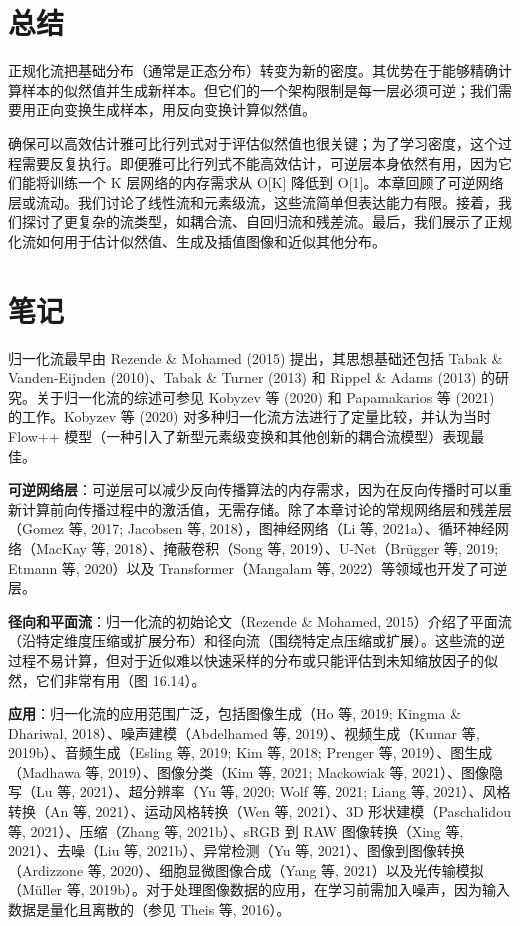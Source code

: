 \section{总结}
正规化流把基础分布（通常是正态分布）转变为新的密度。其优势在于能够精确计算样本的似然值并生成新样本。但它们的一个架构限制是每一层必须可逆；我们需要用正向变换生成样本，用反向变换计算似然值。

确保可以高效估计雅可比行列式对于评估似然值也很关键；为了学习密度，这个过程需要反复执行。即便雅可比行列式不能高效估计，可逆层本身依然有用，因为它们能将训练一个 K 层网络的内存需求从 O[K] 降低到 O[1]。本章回顾了可逆网络层或流动。我们讨论了线性流和元素级流，这些流简单但表达能力有限。接着，我们探讨了更复杂的流类型，如耦合流、自回归流和残差流。最后，我们展示了正规化流如何用于估计似然值、生成及插值图像和近似其他分布。

\section{笔记}
归一化流最早由 Rezende \& Mohamed (2015) 提出，其思想基础还包括 Tabak \& Vanden-Eijnden (2010)、Tabak \& Turner (2013) 和 Rippel \& Adams (2013) 的研究。关于归一化流的综述可参见 Kobyzev 等 (2020) 和 Papamakarios 等 (2021) 的工作。Kobyzev 等 (2020) 对多种归一化流方法进行了定量比较，并认为当时 Flow++ 模型（一种引入了新型元素级变换和其他创新的耦合流模型）表现最佳。

\textbf{可逆网络层}：可逆层可以减少反向传播算法的内存需求，因为在反向传播时可以重新计算前向传播过程中的激活值，无需存储。除了本章讨论的常规网络层和残差层（Gomez 等, 2017; Jacobsen 等, 2018），图神经网络（Li 等, 2021a）、循环神经网络（MacKay 等, 2018）、掩蔽卷积（Song 等, 2019）、U-Net（Brügger 等, 2019; Etmann 等, 2020）以及 Transformer（Mangalam 等, 2022）等领域也开发了可逆层。

\textbf{径向和平面流}：归一化流的初始论文（Rezende \& Mohamed, 2015）介绍了平面流（沿特定维度压缩或扩展分布）和径向流（围绕特定点压缩或扩展）。这些流的逆过程不易计算，但对于近似难以快速采样的分布或只能评估到未知缩放因子的似然，它们非常有用（图 16.14）。

\textbf{应用}：归一化流的应用范围广泛，包括图像生成（Ho 等, 2019; Kingma \& Dhariwal, 2018）、噪声建模（Abdelhamed 等, 2019）、视频生成（Kumar 等, 2019b）、音频生成（Esling 等, 2019; Kim 等, 2018; Prenger 等, 2019）、图生成（Madhawa 等, 2019）、图像分类（Kim 等, 2021; Mackowiak 等, 2021）、图像隐写（Lu 等, 2021）、超分辨率（Yu 等, 2020; Wolf 等, 2021; Liang 等, 2021）、风格转换（An 等, 2021）、运动风格转换（Wen 等, 2021）、3D 形状建模（Paschalidou 等, 2021）、压缩（Zhang 等, 2021b）、sRGB 到 RAW 图像转换（Xing 等, 2021）、去噪（Liu 等, 2021b）、异常检测（Yu 等, 2021）、图像到图像转换（Ardizzone 等, 2020）、细胞显微图像合成（Yang 等, 2021）以及光传输模拟（Müller 等, 2019b）。对于处理图像数据的应用，在学习前需加入噪声，因为输入数据是量化且离散的（参见 Theis 等, 2016）。

